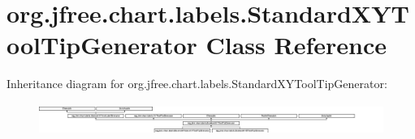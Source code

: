 \hypertarget{classorg_1_1jfree_1_1chart_1_1labels_1_1_standard_x_y_tool_tip_generator}{}\section{org.\+jfree.\+chart.\+labels.\+Standard\+X\+Y\+Tool\+Tip\+Generator Class Reference}
\label{classorg_1_1jfree_1_1chart_1_1labels_1_1_standard_x_y_tool_tip_generator}
Inheritance diagram for org.\+jfree.\+chart.\+labels.\+Standard\+X\+Y\+Tool\+Tip\+Generator\+:\begin{figure}[H]
\begin{center}
\leavevmode
\includegraphics[height=1.072797cm]{classorg_1_1jfree_1_1chart_1_1labels_1_1_standard_x_y_tool_tip_generator}
\end{center}
\end{figure}
